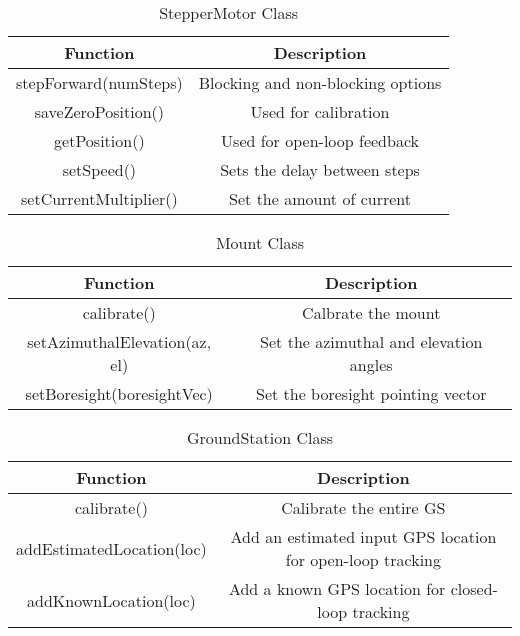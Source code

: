 \begin{table}[!htb]
  \centering
  \caption{StepperMotor Class}
  \renewcommand{\arraystretch}{1.2}
  \begin{tabular}{ |c|c| }
  \hline
  \textbf{Function}        & \textbf{Description}    \\
  \hline
    stepForward(numSteps)         & Blocking and non-blocking options \\
    saveZeroPosition()            & Used for calibration \\
    getPosition()                 & Used for open-loop feedback \\
    setSpeed()                    & Sets the delay between steps \\
    setCurrentMultiplier()        & Set the amount of current \\
  \hline
  \end{tabular}
  \label{tab:stepperMotorUML}
\end{table}

\begin{table}[!htb]
  \centering
  \caption{Mount Class}
  \renewcommand{\arraystretch}{1.2}
  \begin{tabular}{ |c|c| }
  \hline
  \textbf{Function}        & \textbf{Description}    \\
  \hline
    calibrate()                         & Calbrate the mount \\
    setAzimuthalElevation(az, el)       & Set the azimuthal and elevation angles \\
    setBoresight(boresightVec)          & Set the boresight pointing vector \\
  \hline
  \end{tabular}
  \label{tab:mountUML}
\end{table}

\begin{table}[!htb]
  \centering
  \caption{GroundStation Class}
  \renewcommand{\arraystretch}{1.2}
  \begin{tabular}{ |c|c| }
  \hline
  \textbf{Function}             & \textbf{Description}    \\
  \hline
    calibrate()                 & Calibrate the entire GS \\
    addEstimatedLocation(loc)      & Add an estimated input GPS location for open-loop tracking \\
    addKnownLocation(loc)          & Add a known GPS location for closed-loop tracking \\
  \hline
  \end{tabular}
  \label{tab:groundStationUML}
\end{table}

